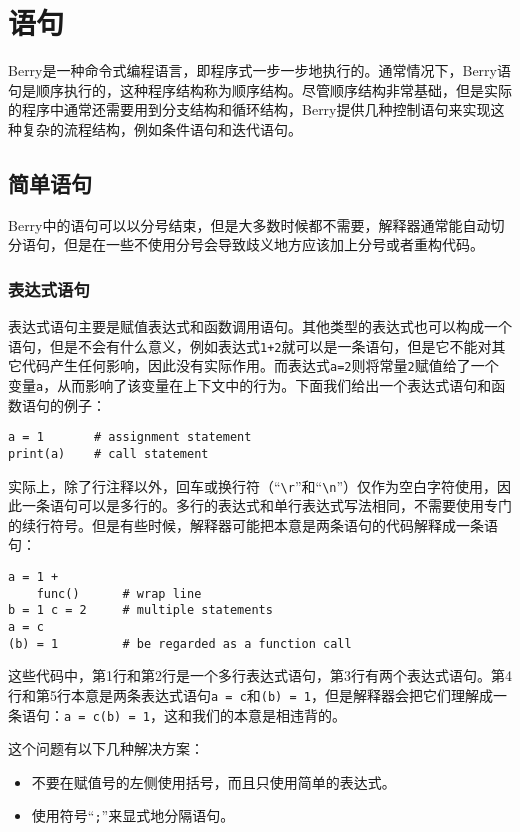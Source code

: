 \chapter{语句}

Berry是一种命令式编程语言，即程序式一步一步地执行的。通常情况下，Berry语句是顺序执行的，这种程序结构称为顺序结构。尽管顺序结构非常基础，但是实际的程序中通常还需要用到分支结构和循环结构，Berry提供几种控制语句来实现这种复杂的流程结构，例如条件语句和迭代语句。

\section{简单语句}

Berry中的语句可以以分号结束，但是大多数时候都不需要，解释器通常能自动切分语句，但是在一些不使用分号会导致歧义地方应该加上分号或者重构代码。

\subsection{表达式语句}
表达式语句主要是赋值表达式和函数调用语句。其他类型的表达式也可以构成一个语句，但是不会有什么意义，例如表达式\texttt{1+2}就可以是一条语句，但是它不能对其它代码产生任何影响，因此没有实际作用。而表达式\texttt{a=2}则将常量\texttt{2}赋值给了一个变量\texttt{a}，从而影响了该变量在上下文中的行为。下面我们给出一个表达式语句和函数语句的例子：
\begin{lstlisting}[language=berry, numbers=none]
a = 1       # assignment statement
print(a)    # call statement
\end{lstlisting}

实际上，除了行注释以外，回车或换行符（``\texttt{\textbackslash r}''和``\texttt{\textbackslash n}''）仅作为空白字符使用，因此一条语句可以是多行的。多行的表达式和单行表达式写法相同，不需要使用专门的续行符号。但是有些时候，解释器可能把本意是两条语句的代码解释成一条语句：
\begin{lstlisting}[language=berry]
a = 1 +
    func()      # wrap line
b = 1 c = 2     # multiple statements
a = c
(b) = 1         # be regarded as a function call
\end{lstlisting}
这些代码中，第1行和第2行是一个多行表达式语句，第3行有两个表达式语句。第4行和第5行本意是两条表达式语句\texttt{a = c}和\texttt{(b) = 1}，但是解释器会把它们理解成一条语句：\texttt{a = c(b) = 1}，这和我们的本意是相违背的。

这个问题有以下几种解决方案：
\begin{itemize}
    \item 不要在赋值号的左侧使用括号，而且只使用简单的表达式。
    \item 使用符号``\texttt{;}''来显式地分隔语句。
\end{itemize}

